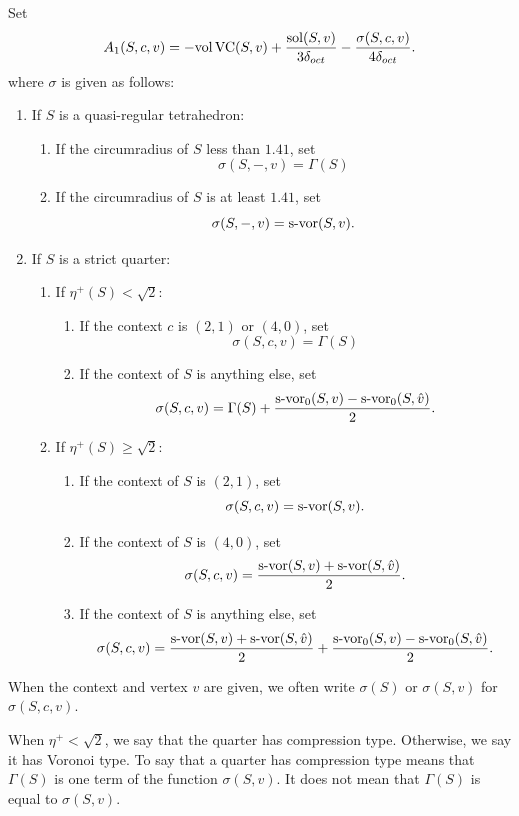 \begin{definition}\label{def:sigma}
Set
   \begin{equation}\label{eqn:a1-sigma}
   A_1(S,c,v) = -{\operatorname{vol}}\,{\operatorname{VC}}(S,v)+
      \frac{\operatorname{sol}(S,v)}{3\delta_{oct}} - \frac{\sigma(S,c,v)}{4\delta_{oct}}.
      \end{equation}  where $\sigma$ is given as follows:
\begin{enumerate}
\item If $S$ is a quasi-regular tetrahedron:
   \begin{enumerate}
      \item If the circumradius of $S$ less than $1.41$, set
         $$\sigma(S,-,v)=\Gamma(S)$$
      \item If the circumradius of $S$ is at least $1.41$, set
         $$\sigma(S,-,v)=\operatorname{s-vor}(S,v).$$
   \end{enumerate}
\item If $S$ is a strict quarter:
   \begin{enumerate}
      \item If $\eta^+(S) <\sqrt2$:
         \begin{enumerate}
         \item If the context $c$ is $(2,1)$ or $(4,0)$, set
                  $$\sigma(S,c,v)=\Gamma(S)$$
         \item If the context of $S$ is anything else, set
                  $$\sigma(S,c,v)=\Gamma(S) +
                     \frac{\operatorname{s-vor}_0(S,v)-\operatorname{s-vor}_0(S,\hat v)}{2}.$$
         \end{enumerate}
      \item If $\eta^+(S) \ge\sqrt2$:
         \begin{enumerate}
         \item If the context of $S$ is $(2,1)$, set
                  $$\sigma(S,c,v)=\operatorname{s-vor}(S,v).$$
         \item If the context of $S$ is $(4,0)$, set
                  $$\sigma(S,c,v)=\frac{\operatorname{s-vor}(S,v)+\operatorname{s-vor}(S,\hat v)}{2}.$$
         \item If the context of $S$ is anything else, set
                  $$\sigma(S,c,v)=\frac{\operatorname{s-vor}(S,v)+\operatorname{s-vor}(S,\hat
                  v)}{2}
                     +\frac{\operatorname{s-vor}_0(S,v)-\operatorname{s-vor}_0(S,\hat v)}{2}.$$
         \end{enumerate}
   \end{enumerate}
\end{enumerate}
When the context and vertex $v$ are given, we often write
$\sigma(S)$ or $\sigma(S,v)$ for $\sigma(S,c,v)$.

When $\eta^+<\sqrt2$, we say that the quarter has compression type.
Otherwise, we say it has Voronoi type.  To say that a quarter has
compression type means that $\Gamma(S)$ is one term of the function
$\sigma(S,v)$. It does not mean that $\Gamma(S)$ is equal to
$\sigma(S,v)$.
%
\end{definition}

